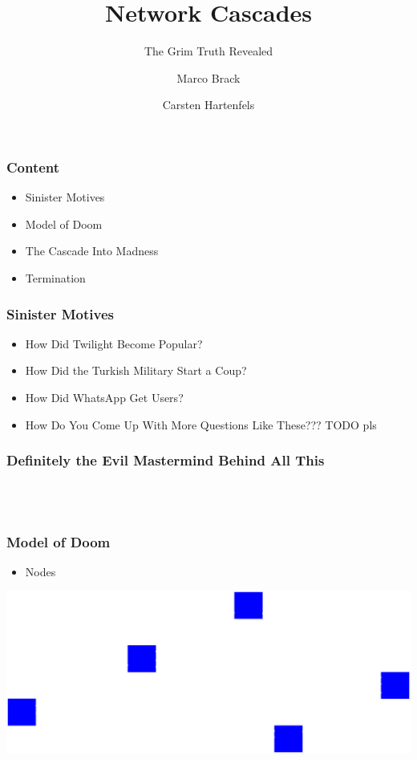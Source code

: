 \documentclass[slidestop,usenames,dvipsnames]{beamer}
\title{Network Cascades}
\subtitle{The Grim Truth Revealed}
\author{Marco Brack \and Carsten Hartenfels}
\newcommand{\fitem}{\pause\vfill\item}
\newcommand{\gitem}{\vfill\item}
\begin{document}
\begin{frame}
    \titlepage
\end{frame}




\begin{frame}
    \frametitle{Content}
    \begin{itemize}
        \gitem Sinister Motives
        \gitem Model of Doom
        \gitem The Cascade Into Madness
        \gitem Termination
    \end{itemize}
    \vfill
\end{frame}


\begin{frame}
    \frametitle{Sinister Motives}
    \begin{itemize}
        \fitem How Did Twilight Become Popular?
        \fitem How Did the Turkish Military Start a Coup?
        \fitem How Did WhatsApp Get Users?
        \fitem How Do You Come Up With More Questions Like These??? TODO pls
    \end{itemize}
    \vfill
\end{frame}

\begin{frame}
    \frametitle{Definitely the Evil Mastermind Behind All This}
    \vfill
    \begin{center}
        \\
        \vspace{20pt}
        \\
        \vspace{20pt}
    \end{center}
    \vfill
\end{frame}


\begin{frame}
    \frametitle{Model of Doom}
    \begin{itemize}
        \gitem Nodes
    \end{itemize}
    \vfill
    \includegraphics[width=\textwidth]{img/model1}
    \vfill
\end{frame}
\end{document}
